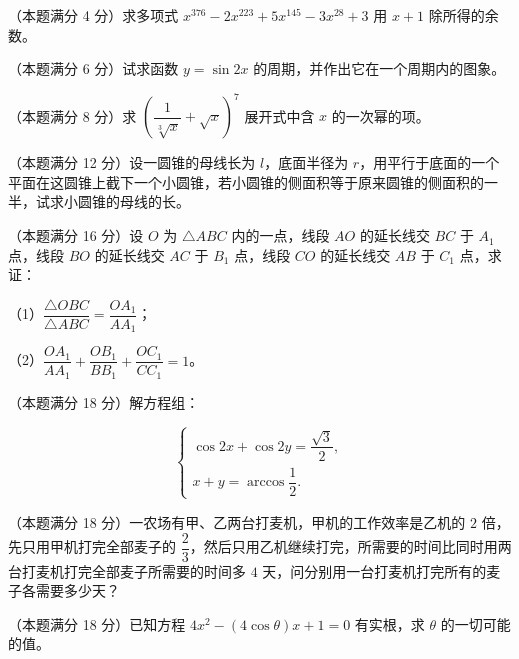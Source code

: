 


\begin{question}
（本题满分 4 分）求多项式 $x^{376}-2x^{223}+5x^{145}-3x^{28}+3$ 用 $x+1$ 除所得的余数。

\end{question}
\begin{question}
（本题满分 6 分）试求函数 $y=\sin 2x$ 的周期，并作出它在一个周期内的图象。

\end{question}
\begin{question}
（本题满分 8 分）求 $\left(\dfrac{1}{\sqrt[3]{x}}+\sqrt{x}\right)^7$ 展开式中含 $x$ 的一次幂的项。

\end{question}
\begin{question}
（本题满分 12 分）设一圆锥的母线长为 $l$，底面半径为 $r$，用平行于底面的一个平面在这圆锥上截下一个小圆锥，若小圆锥的侧面积等于原来圆锥的侧面积的一半，试求小圆锥的母线的长。

\end{question}

\begin{question}
（本题满分 16 分）设 $O$ 为 $\triangle ABC$ 内的一点，线段 $AO$ 的延长线交 $BC$ 于 $A_1$ 点，线段 $BO$ 的延长线交 $AC$ 于 $B_1$ 点，线段 $CO$ 的延长线交 $AB$ 于 $C_1$ 点，求证：

（1）$\dfrac{\triangle OBC}{\triangle ABC}=\dfrac{OA_1}{AA_1}$；

（2）$\dfrac{OA_1}{AA_1}+\dfrac{OB_1}{BB_1}+\dfrac{OC_1}{CC_1}=1$。

\end{question}
\begin{question}
（本题满分 18 分）解方程组：

\nopagebreak[4]
\[
\begin{cases}
\cos 2x+\cos 2y=\dfrac{\sqrt3}{2},\\[2pt]
x+y=\arccos\dfrac12.
\end{cases}
\]

\end{question}
\begin{question}
（本题满分 18 分）一农场有甲、乙两台打麦机，甲机的工作效率是乙机的 $2$ 倍，先只用甲机打完全部麦子的 $\dfrac23$，然后只用乙机继续打完，所需要的时间比同时用两台打麦机打完全部麦子所需要的时间多 $4$ 天，问分别用一台打麦机打完所有的麦子各需要多少天？

\end{question}
\begin{question}
（本题满分 18 分）已知方程 $4x^2-(4\cos\theta)x+1=0$ 有实根，求 $\theta$ 的一切可能的值。

\end{question}